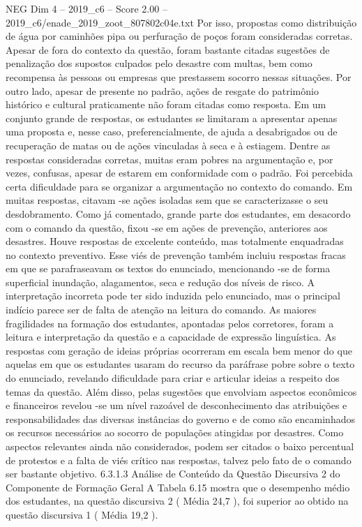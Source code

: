 \begin{textsample}{NEG Dim 4 – 2019\_c6 – Score 2.00 – 2019\_c6/enade\_2019\_zoot\_807802c04e.txt}
Por isso, propostas como distribuição de água por caminhões pipa ou perfuração de poços foram consideradas corretas.
Apesar de fora do contexto da questão, foram bastante citadas sugestões de penalização dos supostos culpados pelo desastre com multas, bem como recompensa às pessoas ou empresas que prestassem socorro nessas situações.
Por outro lado, apesar de presente no padrão, ações de resgate do patrimônio histórico e cultural praticamente não foram citadas como resposta.
Em um conjunto grande de respostas, os estudantes se limitaram a apresentar apenas uma proposta e, nesse caso, preferencialmente, de ajuda a desabrigados ou de recuperação de matas ou de ações vinculadas à seca e à estiagem.
Dentre as respostas consideradas corretas, muitas eram pobres na argumentação e, por vezes, confusas, apesar de estarem em conformidade com o padrão.
Foi percebida certa dificuldade para se organizar a argumentação no contexto do comando.
Em muitas respostas, citavam -se ações isoladas sem que se caracterizasse o seu desdobramento.
Como já comentado, grande parte dos estudantes, em desacordo com o comando da questão, fixou -se em ações de prevenção, anteriores aos desastres.
Houve respostas de excelente conteúdo, mas totalmente enquadradas no contexto preventivo.
Esse viés de prevenção também incluiu respostas fracas em que se parafraseavam os textos do enunciado, mencionando -se de forma superficial inundação, alagamentos, seca e redução dos níveis de risco.
A interpretação incorreta pode ter sido induzida pelo enunciado, mas o principal indício parece ser de falta de atenção na leitura do comando.
As maiores fragilidades na formação dos estudantes, apontadas pelos corretores, foram a leitura e interpretação da questão e a capacidade de expressão linguística.
As respostas com geração de ideias próprias ocorreram em escala bem menor do que aquelas em que os estudantes usaram do recurso da paráfrase pobre sobre o texto do enunciado, revelando dificuldade para criar e articular ideias a respeito dos temas da questão.
Além disso, pelas sugestões que envolviam aspectos econômicos e financeiros revelou -se um nível razoável de desconhecimento das atribuições e responsabilidades das diversas instâncias do governo e de como são encaminhados os recursos necessários ao socorro de populações atingidas por desastres.
Como aspectos relevantes ainda não considerados, podem ser citados o baixo percentual de protestos e a falta de viés crítico nas respostas, talvez pelo fato de o comando ser bastante objetivo. 6.3.1.3 Análise de Conteúdo da Questão Discursiva 2 do Componente de Formação Geral A Tabela 6.15 mostra que o desempenho médio dos estudantes, na questão discursiva 2 ( Média 24,7 ), foi superior ao obtido na questão discursiva 1 ( Média 19,2 ).

\end{textsample}
